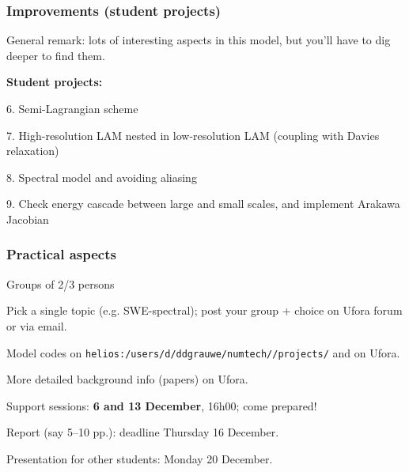 \documentclass[aspectratio=43,9pt]{beamer}
\begin{document}
%
%
\begin{frame}
	\frametitle{Improvements (student projects)}
	General remark: lots of interesting aspects in this model, but you'll have to dig deeper to find them.
	\par\vspace*{4ex}
	{\bf Student projects:}
	\begin{myitemize}{1ex}
		\item[6.] Semi-Lagrangian scheme
		\item[7.] High-resolution LAM nested in low-resolution LAM (coupling with Davies relaxation)
		\item[8.] Spectral model and avoiding aliasing
		\item[9.] Check energy cascade between large and small scales, and implement Arakawa Jacobian
	\end{myitemize}
\end{frame}
%
%
\begin{frame}
	\frametitle{Practical aspects}
	\begin{myitemize}{2ex}
		\item Groups of 2/3 persons
		\item Pick a single topic (e.g. SWE-spectral); post your group + choice on Ufora forum or via email.
		\item Model codes on \texttt{helios:/users/d/ddgrauwe/numtech/\unskip/projects/} and on Ufora.
		\item More detailed background info (papers) on Ufora.
		\item Support sessions: \textbf{6 and 13 December}, 16h00; come prepared!
		\item Report (say 5--10 pp.): deadline Thursday 16 December.
		\item Presentation for other students: Monday 20 December.
	\end{myitemize}
\end{frame}
%
%
\end{document}
